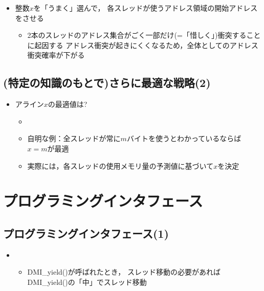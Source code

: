 \documentclass[25pt,papersize,landscape]{jsarticle}
\begin{document}
\begin{itemize}
\item 整数$x$を「うまく」選んで，
  各スレッドが使うアドレス領域の開始アドレスをさせる
  \begin{itemize}
  \item 2本のスレッドのアドレス集合がごく一部だけ(=「惜しく」)衝突することに起因する
    アドレス衝突が起きにくくなるため，全体としてのアドレス衝突確率が下がる
  \end{itemize}
\end{itemize}


\subsection{(特定の知識のもとで)さらに最適な戦略(2)}

\begin{itemize}
\item アライン$x$の最適値は?
  \begin{itemize}
  \item {}
  \item 自明な例：全スレッドが常に$m$バイトを使うとわかっているならば$x=m$が最適
  \item 実際には，各スレッドの使用メモリ量の予測値に基づいて$x$を決定
  \end{itemize}
\end{itemize}


\section{プログラミングインタフェース}

\subsection{プログラミングインタフェース(1)}


\begin{itemize}
\item {}
  \begin{itemize}
  \item DMI\_yield()が呼ばれたとき，
    スレッド移動の必要があればDMI\_yield()の「中」でスレッド移動
  \end{itemize}
\end{itemize}
\end{document}
